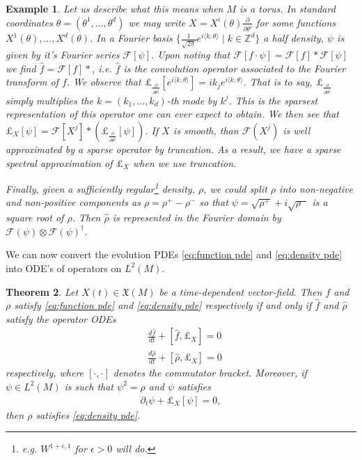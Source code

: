 \documentclass[final,leqno]{siamltex1213}
\newcommand{\pder}[2]{\ensuremath{\frac{ \partial #1}{\partial #2}}}
\newtheorem{thm}{Theorem}[section]
\newtheorem{example}[thm]{Example}
\begin{document}
\begin{example}
Let us describe what this means when $M$ is a torus.
In standard coordinates $\theta = (\theta^{1},\dots,\theta^{d})$ we may write $X = X^{i}(\theta) \frac{\partial}{\partial \theta^{i}}$ for some functions $X^{1}(\theta),\dots,X^{d}(\theta)$.
In a Fourier basis $\{ \frac{1}{\sqrt{2\pi}} e^{ i \langle k , \theta \rangle}   \mid k \in \mathbb{Z}^{d} \}$ 
a half density, $\psi$ is given by it's Fourier series $\mathcal{F}[\psi]$.
Upon noting that $\mathcal{F}[ f \cdot \psi] = \mathcal{F}[f] * \mathcal{F}[\psi]$
we find $\hat{f} = \mathcal{F}[f] * $, i.e. $\hat{f}$ is the convolution operator associated to the Fourier transform of $f$.
We observe that $\pounds_{ \pder{}{\theta^{j}} } [ e^{i \langle k , \theta \rangle}]  = i k_{j} e^{i \langle k,\theta\rangle}$.
That is to say, $\pounds_{ \pder{}{\theta^{j}} }$ simply multiplies the $k = (k_{1},\dots,k_{d})$-th mode by $k^{j}$.
This is the sparsest representation of this operator one can ever expect to obtain.
We then see that $\pounds_{X} [\psi] = \mathcal{F}[X^{j}] *  \left( \pounds_{ \pder{}{\theta^{j}} }[ \psi ] \right)$.
If $X$ is smooth, than $\mathcal{F}(X^{j})$ is well approximated by a sparse operator by truncation.
As a result, we have a sparse spectral approximation of $\pounds_{X}$ when we use truncation.

Finally, given a sufficiently regular\footnote{e.g. $W^{1+\epsilon,1}$ for $\epsilon >0$ will do.} density, $\rho$,  we could 
split $\rho$ into non-negative and non-positive components as $\rho = \rho^{+} - \rho^{-}$
so that $\psi = \sqrt{\rho^{+}} + i \sqrt{\rho^{-}}$ is a square root of $\rho$.
Then $\hat{\rho}$ is represented in the Fourier domain by $\mathcal{F}(\psi) \otimes \mathcal{F}(\psi)^{\dagger}$.
\end{example}

We can now convert the evolution PDEs \eqref{eq:function pde} and \eqref{eq:density pde}
into ODE's of operators on $L^{2}(M)$.

\begin{thm} \label{thm:quantize}
	Let $X(t) \in \mathfrak{X}(M)$ be a time-dependent vector-field.
	Then $f$ and $\rho$ satisfy \eqref{eq:function pde} and \eqref{eq:density pde} respectively
	if and only if $\hat{f}$ and $\hat{\rho}$ satisfy the operator ODEs
	\begin{align}
		&\frac{d \hat{f} }{dt} + [ \hat{f} , \pounds_{X} ] = 0 \label{eq:quantum observable ode} \\
		&\frac{d \hat{\rho} }{dt} + [ \hat{\rho} , \pounds_{X} ] = 0 \label{eq:quantum density ode}
	\end{align}
	respectively, where $[ \cdot , \cdot ]$ denotes the commutator bracket.
	Moreover, if $\psi \in L^{2}(M)$ is such that $\psi^{2} = \rho$ and $\psi$ satisfies
	\begin{align}
		 \partial_{t} \psi + \pounds_{X}[\psi] = 0, \label{eq:half density pde}
	\end{align}
	then $\rho$ satisfies \eqref{eq:density pde}.
\end{thm}
\end{document}
